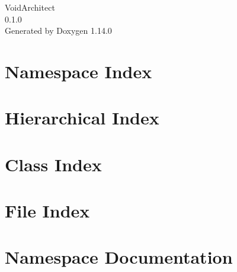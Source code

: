\documentclass[twoside]{book}
\newcommand{\+}{\discretionary{\mbox{\scriptsize$\hookleftarrow$}}{}{}}
\newcommand{\clearemptydoublepage}{%
    \newpage{\pagestyle{empty}\cleardoublepage}%
  }
\begin{document}
  \raggedbottom
    \hypersetup{pageanchor=false,
                bookmarksnumbered=true,
                pdfencoding=unicode
               }
  \begin{titlepage}
  \vspace*{7cm}
  \begin{center}%
  {\Large Void\+Architect}\\
  [1ex]\large 0.\+1.\+0 \\
  \vspace*{1cm}
  {\large Generated by Doxygen 1.14.0}\\
  \end{center}
  \end{titlepage}
  \clearemptydoublepage
  \tableofcontents
  \clearemptydoublepage
  \hypersetup{pageanchor=true}
\chapter{Namespace Index}

\chapter{Hierarchical Index}

\chapter{Class Index}

\chapter{File Index}

\chapter{Namespace Documentation}















\end{document}
